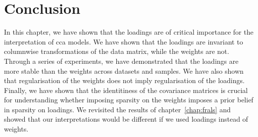 \section{Conclusion}

In this chapter, we have shown that the \gls{loadings} are of critical importance for the interpretation of \acrshort{cca} models.
We have shown that the \gls{loadings} are invariant to columnwise transformations of the data matrix, while the \gls{weights} are not.
Through a series of experiments, we have demonstrated that the \gls{loadings} are more stable than the \gls{weights} across datasets and samples.
We have also shown that regularisation of the \gls{weights} does not imply regularisation of the \gls{loadings}.
Finally, we have shown that the identitiness of the covariance matrices is crucial for understanding whether imposing sparsity on the \gls{weights} imposes a prior belief in sparsity on loadings.
We revisited the results of chapter~\ref{chap:frals} and showed that our interpretations would be different if we used \gls{loadings} instead of \gls{weights}.